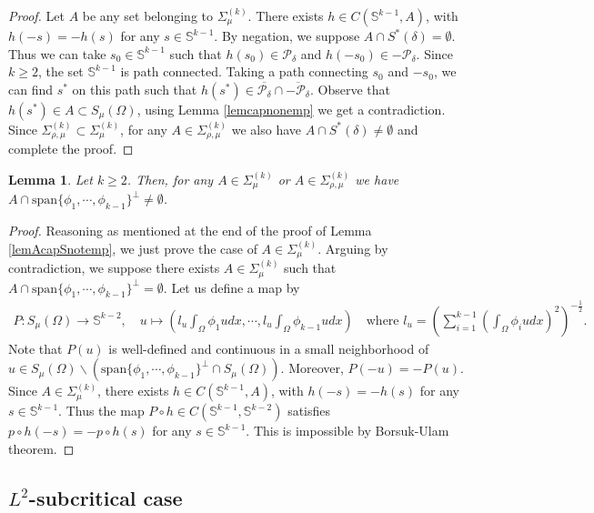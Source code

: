 \documentclass[10pt,a4paper]{article}
\newtheorem{lemma}[theorem]{Lemma}
\theoremstyle{definition} \theoremstyle{remark}
\numberwithin{equation}{section}
\newcommand{\p}{\mathcal{P}}
\newcommand{\s}{\mathbb{S}}
\begin{document}
\begin{proof}
	Let $A$ be any set belonging to $\Sigma_{\mu}^{(k)}$. There exists $h \in C(\s^{k-1},A)$, with $h(-s) = -h(s)$ for any $s \in \s^{k-1}$. By negation, we suppose $A \cap S^*(\delta) = \emptyset$. Thus we can take $s_0 \in \s^{k-1}$ such that $h(s_0) \in \p_\delta$ and $h(-s_0) \in -\p_\delta$. Since $k \ge 2$, the set $\s^{k-1}$ is path connected. Taking a path connecting $s_0$ and $-s_0$, we can find $s^*$ on this path such that $h(s^*) \in \overline{\p_\delta} \cap \overline{-\p_\delta}$. Observe that $h(s^*) \in A \subset S_\mu(\Omega)$, using Lemma \ref{lemcapnonemp} we get a contradiction. Since $\Sigma_{\rho,\mu}^{(k)} \subset \Sigma_{\mu}^{(k)}$, for any $A \in \Sigma_{\rho,\mu}^{(k)}$ we also have $A \cap S^*(\delta) \neq \emptyset$ and complete the proof.
\end{proof}

\begin{lemma} \label{lemnonempty}
	Let $k \geq 2$. Then, for any $A \in \Sigma_{\mu}^{(k)}$ or $A \in \Sigma_{\rho,\mu}^{(k)}$ we have $A \cap \text{span}\{\phi_1,\cdots,\phi_{k-1}\}^{\bot} \neq \emptyset$.
\end{lemma}

\begin{proof}
	Reasoning as mentioned at the end of the proof of Lemma \ref{lemAcapSnotemp}, we just prove the case of $A \in \Sigma_{\mu}^{(k)}$. Arguing by contradiction, we suppose there exists $A \in \Sigma_{\mu}^{(k)}$ such that $A \cap \text{span}\{\phi_1,\cdots,\phi_{k-1}\}^{\bot} = \emptyset$. Let us define a map by
	\begin{align*}
		P : S_\mu(\Omega) \to \s^{k-2}, \quad u \mapsto (l_u\int_\Omega \phi_1 udx, \cdots, l_u\int_\Omega \phi_{k-1} udx) \quad \text{where } l_u = \left( \sum_{i=1}^{k-1}\left( \int_\Omega \phi_i udx\right)^2 \right) ^{-\frac12}.
	\end{align*}
    Note that $P(u)$ is well-defined and continuous in a small neighborhood of $u \in S_\mu(\Omega) \backslash (\text{span}\{\phi_1,\cdots,\phi_{k-1}\}^{\bot}  \cap S_\mu(\Omega))$. Moreover, $P(-u) = -P(u)$. Since $A \in \Sigma_{\mu}^{(k)}$, there exists $h \in C(\s^{k-1},A)$, with $h(-s) = -h(s)$ for any $s \in \s^{k-1}$. Thus the map $P \circ h \in C(\s^{k-1},\s^{k-2})$ satisfies $p \circ h (-s) = - p \circ h (s)$ for any $s \in \s^{k-1}$. This is impossible by Borsuk-Ulam theorem.
\end{proof}

\subsection{$L^2$-subcritical case}
\end{document}

